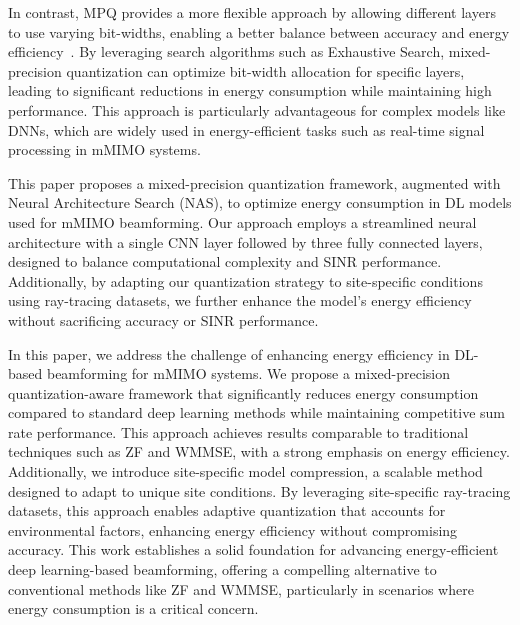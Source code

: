 In contrast, \gls{MPQ} provides a more flexible approach by allowing different layers to use varying bit-widths, enabling a better balance between accuracy and energy efficiency~\cite{DBLP:journals/corr/abs-1805-06085}. By leveraging search algorithms such as Exhaustive Search, mixed-precision quantization can optimize bit-width allocation for specific layers, leading to significant reductions in energy consumption while maintaining high performance. This approach is particularly advantageous for complex models like \gls{DNN}s, which are widely used in energy-efficient tasks such as real-time signal processing in mMIMO systems.

This paper proposes a mixed-precision quantization framework, augmented with Neural Architecture Search (NAS)\cite{elsken2019neural}, to optimize energy consumption in DL models used for mMIMO beamforming. Our approach employs a streamlined neural architecture with a single CNN layer followed by three fully connected layers, designed to balance computational complexity and \gls{SINR} performance. Additionally, by adapting our quantization strategy to site-specific conditions using ray-tracing datasets, we further enhance the model's energy efficiency without sacrificing accuracy or SINR performance.

In this paper, we address the challenge of enhancing energy efficiency in \gls{DL}-based beamforming for \gls{mMIMO} systems. We propose a mixed-precision quantization-aware framework that significantly reduces energy consumption compared to standard deep learning methods while maintaining competitive sum rate performance. This approach achieves results comparable to traditional techniques such as \gls{ZF} and \gls{WMMSE}, with a strong emphasis on energy efficiency.
Additionally, we introduce site-specific model compression, a scalable method designed to adapt to unique site conditions. By leveraging site-specific ray-tracing datasets, this approach enables adaptive quantization that accounts for environmental factors, enhancing energy efficiency without compromising accuracy. 
This work establishes a solid foundation for advancing energy-efficient deep learning-based beamforming, offering a compelling alternative to conventional methods like ZF and WMMSE, particularly in scenarios where energy consumption is a critical concern.
